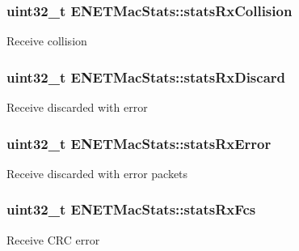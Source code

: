 \subsubsection[{\texorpdfstring{stats\+Rx\+Collision}{statsRxCollision}}]{\setlength{\rightskip}{0pt plus 5cm}uint32\+\_\+t E\+N\+E\+T\+Mac\+Stats\+::stats\+Rx\+Collision}\hypertarget{structENETMacStats_a3c5b37bd5260d32c643937fa9ae77049}{}\label{structENETMacStats_a3c5b37bd5260d32c643937fa9ae77049}
Receive collision 
\subsubsection[{\texorpdfstring{stats\+Rx\+Discard}{statsRxDiscard}}]{\setlength{\rightskip}{0pt plus 5cm}uint32\+\_\+t E\+N\+E\+T\+Mac\+Stats\+::stats\+Rx\+Discard}\hypertarget{structENETMacStats_a46e5eaaf59970224efa0c39d1903c170}{}\label{structENETMacStats_a46e5eaaf59970224efa0c39d1903c170}
Receive discarded with error 
\subsubsection[{\texorpdfstring{stats\+Rx\+Error}{statsRxError}}]{\setlength{\rightskip}{0pt plus 5cm}uint32\+\_\+t E\+N\+E\+T\+Mac\+Stats\+::stats\+Rx\+Error}\hypertarget{structENETMacStats_a5370e5296c698c42aec1bec778f916a0}{}\label{structENETMacStats_a5370e5296c698c42aec1bec778f916a0}
Receive discarded with error packets 
\subsubsection[{\texorpdfstring{stats\+Rx\+Fcs}{statsRxFcs}}]{\setlength{\rightskip}{0pt plus 5cm}uint32\+\_\+t E\+N\+E\+T\+Mac\+Stats\+::stats\+Rx\+Fcs}\hypertarget{structENETMacStats_a9773e2ef3f8ec1c6fc6dd9985cc5f841}{}\label{structENETMacStats_a9773e2ef3f8ec1c6fc6dd9985cc5f841}
Receive C\+RC error 

